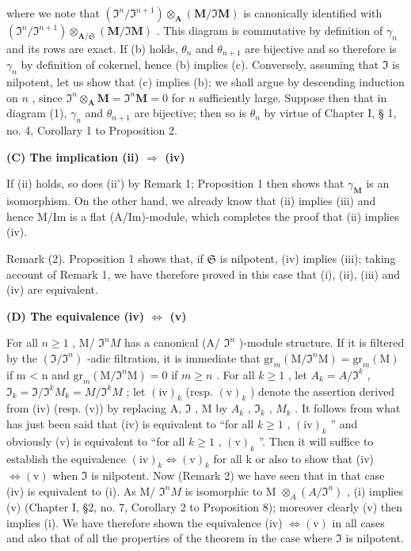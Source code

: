 where we note that \((\mathfrak{I}^n / \mathfrak{I}^{n+1}) \otimes_{\mathbf{A}} (\mathbf{M} / \mathfrak{I}\mathbf{M})\) is canonically identified with \((\mathfrak{I}^n / \mathfrak{I}^{n+1}) \otimes_{\mathbf{A} / \mathfrak{S}} (\mathbf{M} / \mathfrak{I}\mathbf{M})\) . This diagram is commutative by definition of \(\gamma_n\) and its rows are exact. If (b) holds, \(\theta_n\) and \(\theta_{n+1}\) are bijective and so therefore is \(\gamma_n\) by definition of cokernel, hence (b) implies (c). Conversely, assuming that \(\mathfrak{I}\) is nilpotent, let us show that (c) implies (b); we shall argue by descending induction on \(n\) , since \(\mathfrak{I}^n \otimes_{\mathbf{A}} \mathbf{M} = \mathfrak{I}^n\mathbf{M} = 0\) for \(n\) sufficiently large. Suppose then that in diagram (1), \(\gamma_n\) and \(\theta_{n+1}\) are bijective; then so is \(\theta_n\) by virtue of Chapter I, § 1, no. 4, Corollary 1 to Proposition 2.

\textbf{(C) The implication (ii) \(\Rightarrow\) (iv)}\par

If (ii) holds, so does (ii') by Remark 1; Proposition 1 then shows that \(\gamma_{\mathbf{M}}\) is an isomorphism. On the other hand, we already know that (ii) implies (iii) and hence M/Im is a flat (A/Im)-module, which completes the proof that (ii) implies (iv).

Remark (2). Proposition 1 shows that, if \(\mathfrak{S}\) is nilpotent, (iv) implies (iii); taking account of Remark 1, we have therefore proved in this case that (i), (ii), (iii) and (iv) are equivalent.

\textbf{(D) The equivalence (iv) \(\Leftrightarrow\) (v)}\par

For all \(n \geqslant 1\) , M/ \(\Im^{n}M\) has a canonical (A/ \(\Im^{n}\) )-module structure. If it is filtered by the \((\Im/\Im^{n})\) -adic filtration, it is immediate that \(\mathrm{gr}_{m}(\mathrm{M}/\Im^{n}\mathrm{M}) = \mathrm{gr}_{m}(\mathrm{M})\) if m \textless{} n and \(\mathrm{gr}_{m}(\mathrm{M}/\Im^{n}\mathrm{M}) = 0\) if \(m \geqslant n\) . For all \(k \geqslant 1\) , let \(A_{k} = A/\Im^{k}\) , \(\Im_{k} = \Im/\Im^{k} M_{k} = M/\Im^{k} M\) ; let \((\mathrm{iv})_{k}\) (resp. \((\mathrm{v})_{k}\) ) denote the assertion derived from (iv) (resp. (v)) by replacing A, \(\Im\) , M by \(A_{k}\) , \(\Im_{k}\) , \(M_{k}\) . It follows from what has just been said that (iv) is equivalent to ``for all \(k \geqslant 1\) , \((\mathrm{iv})_{k}\) '' and obviously (v) is equivalent to ``for all \(k \geqslant 1\) , \((\mathrm{v})_{k}\) ''. Then it will suffice to establish the equivalence \((\mathrm{iv})_{k} \Leftrightarrow (\mathrm{v})_{k}\) for all k or also to show that (iv) \(\Leftrightarrow (\mathrm{v})\) when \(\Im\) is nilpotent. Now (Remark 2) we have seen that in that case (iv) is equivalent to (i). As M/ \(\Im^{n}M\) is isomorphic to M \(\otimes_{A} (A/\Im^{n})\) , (i) implies (v) (Chapter I, §2, no. 7, Corollary 2 to Proposition 8); moreover clearly (v) then implies (i). We have therefore shown the equivalence (iv) \(\Leftrightarrow (\mathrm{v})\) in all cases and also that of all the properties of the theorem in the case where \(\Im\) is nilpotent.

